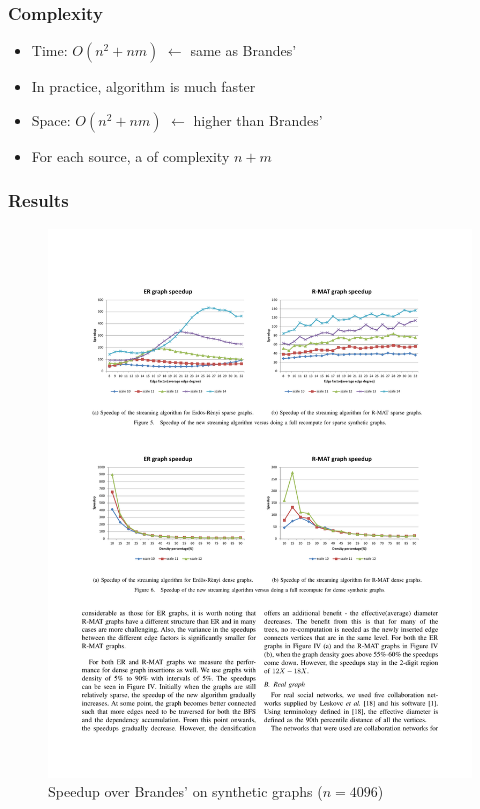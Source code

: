 \begin{frame}
  \frametitle{Complexity}

  \begin{itemize}
    \item Time: $O(n^2 + nm)$ $\leftarrow$ same as Brandes'
    \item In practice, algorithm is much faster
  \end{itemize}
  \begin{itemize}
    \item Space: $O(n^2 + nm)$ $\leftarrow$ higher than Brandes'
    \item For each source, a \spdag of complexity $n + m$
  \end{itemize}

\end{frame}


\begin{frame}
  \frametitle{Results}

  \begin{figure}[t]
    \centering
    \includegraphics[width=\textwidth, height=0.7\textheight, keepaspectratio]{imgs/green-results1}
    \caption{Speedup over Brandes' on synthetic graphs ($n = 4096$)}
  \end{figure}

\end{frame}


